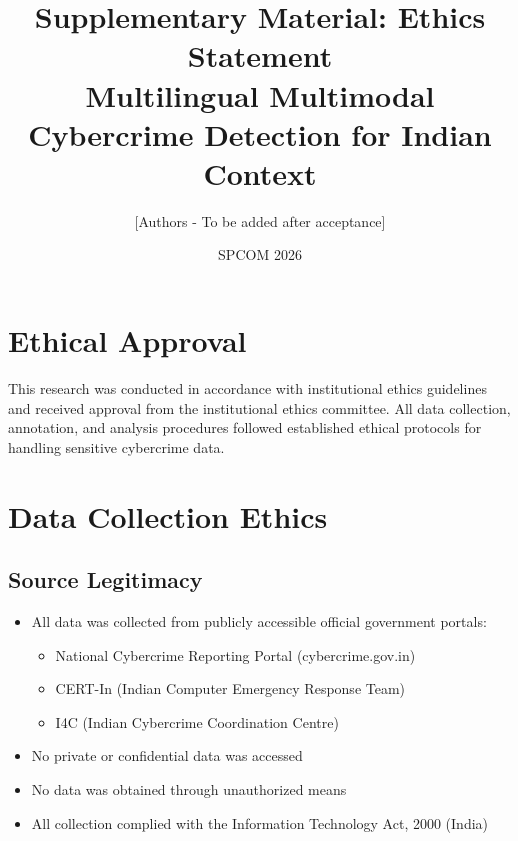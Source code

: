 \documentclass[10pt,a4paper]{article}
\title{Supplementary Material: Ethics Statement\\
\large Multilingual Multimodal Cybercrime Detection for Indian Context}
\author{[Authors - To be added after acceptance]}
\date{SPCOM 2026}
\begin{document}
\maketitle

\section{Ethical Approval}

This research was conducted in accordance with institutional ethics guidelines and received approval from the institutional ethics committee. All data collection, annotation, and analysis procedures followed established ethical protocols for handling sensitive cybercrime data.

\section{Data Collection Ethics}

\subsection{Source Legitimacy}
\begin{itemize}[leftmargin=*]
\item All data was collected from publicly accessible official government portals:
  \begin{itemize}
  \item National Cybercrime Reporting Portal (cybercrime.gov.in)
  \item CERT-In (Indian Computer Emergency Response Team)
  \item I4C (Indian Cybercrime Coordination Centre)
  \end{itemize}
\item No private or confidential data was accessed
\item No data was obtained through unauthorized means
\item All collection complied with the Information Technology Act, 2000 (India)
\end{itemize}
\end{document}
